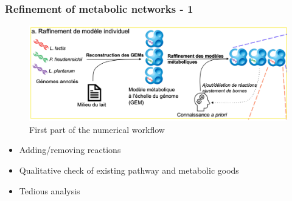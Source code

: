 \documentclass[8pt,usenames,dvipsnames]{beamer}
\begin{document}
%
%
\begin{frame}
\frametitle{Refinement of metabolic networks - 1}

\begin{figure}
\includegraphics[width=\textwidth]{figures/global-a}
\caption{First part of the numerical workflow}
\end{figure}

\begin{block}{}
\begin{itemize}
\item Adding/removing reactions
\item Qualitative check of existing pathway and metabolic goods
\item Tedious analysis
\end{itemize}
\end{block}

\end{frame}
\end{document}
